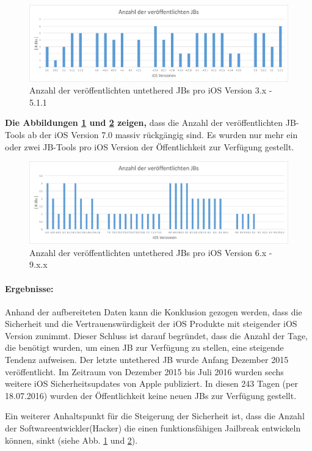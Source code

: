 \begin{figure}[htbp!]
        \centering
                \includegraphics[scale=0.5]{Bilder/iOSJB1.png}
        \caption{Anzahl der veröffentlichten untethered JBs pro iOS \newline Version 3.x - 5.1.1 \protect\footnotemark}
        \label{fig:AnalyseAnzahliOSJB1}
\end{figure}
{}

\textbf{Die Abbildungen \ref{fig:AnalyseAnzahliOSJB1} und \ref{fig:AnalyseAnzahliOSJB2} zeigen,} dass die Anzahl der veröffentlichten JB-Tools ab der iOS Version 7.0 massiv rückgängig sind. Es wurden nur mehr ein oder zwei JB-Tools pro iOS Version der Öffentlichkeit zur Verfügung gestellt. 

\begin{figure}[htbp!]
        \centering
                \includegraphics[scale=0.5]{Bilder/iOSJB2.png}
        \caption{Anzahl der veröffentlichten untethered JBs pro iOS \newline Version 6.x - 9.x.x \protect\footnotemark}
        \label{fig:AnalyseAnzahliOSJB2}
\end{figure}
{}

\paragraph{Ergebnisse:} Anhand der aufbereiteten Daten kann die Konklusion gezogen werden, dass die Sicherheit und die Vertrauenswürdigkeit der iOS Produkte mit steigender iOS Version zunimmt. Dieser Schluss ist darauf begründet, dass die Anzahl der Tage, die benötigt wurden, um einen JB zur Verfügung zu stellen, eine steigende Tendenz aufweisen. Der letzte untethered JB wurde Anfang Dezember 2015 veröffentlicht.
Im Zeitraum von Dezember 2015 bis Juli 2016 wurden sechs weitere iOS Sicherheitsupdates von Apple publiziert. In diesen 243 Tagen (per 18.07.2016) wurden der Öffentlichkeit keine neuen JBs zur Verfügung gestellt.\par 
Ein weiterer Anhaltspunkt für die Steigerung der Sicherheit ist, dass die Anzahl der Softwareentwickler(Hacker) die einen funktionsfähigen Jailbreak entwickeln können, sinkt  (siehe Abb. \ref{fig:AnalyseAnzahliOSJB1} und \ref{fig:AnalyseAnzahliOSJB2}). \par 

